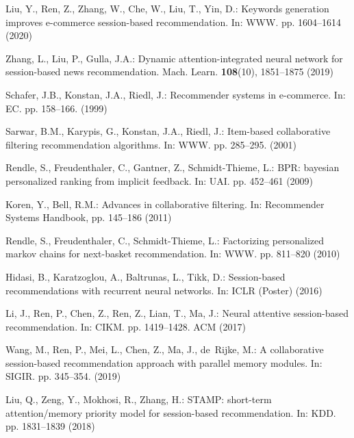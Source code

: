 \documentclass[runningheads]{llncs}
\begin{document}
\begin{thebibliography}{8}


Liu, Y., Ren, Z., Zhang, W., Che, W., Liu, T., Yin, D.: Keywords generation
improves e-commerce session-based recommendation. In: {WWW}. pp. 1604--1614  (2020)

Zhang, L., Liu, P., Gulla, J.A.: Dynamic attention-integrated neural network
for session-based news recommendation. Mach. Learn.  \textbf{108}(10),
1851--1875 (2019)

Schafer, J.B., Konstan, J.A., Riedl, J.: Recommender systems in e-commerce. In: {EC}. pp. 158--166.   (1999)

Sarwar, B.M., Karypis, G., Konstan, J.A., Riedl, J.: Item-based collaborative
filtering recommendation algorithms. In: {WWW}. pp. 285--295.   (2001)

Rendle, S., Freudenthaler, C., Gantner, Z., Schmidt{-}Thieme, L.: {BPR:}
bayesian personalized ranking from implicit feedback. In: {UAI}. pp. 452--461
(2009)

Koren, Y., Bell, R.M.: Advances in collaborative filtering. In: Recommender
Systems Handbook, pp. 145--186 (2011)


Rendle, S., Freudenthaler, C., Schmidt{-}Thieme, L.: Factorizing personalized
markov chains for next-basket recommendation. In: {WWW}. pp. 811--820 (2010)


Hidasi, B., Karatzoglou, A., Baltrunas, L., Tikk, D.: Session-based
recommendations with recurrent neural networks. In: {ICLR} (Poster) (2016)

Li, J., Ren, P., Chen, Z., Ren, Z., Lian, T., Ma, J.: Neural attentive
session-based recommendation. In: {CIKM}. pp. 1419--1428. {ACM} (2017)        
      
Wang, M., Ren, P., Mei, L., Chen, Z., Ma, J., de~Rijke, M.: A collaborative
session-based recommendation approach with parallel memory modules. In:
{SIGIR}. pp. 345--354.   (2019)

Liu, Q., Zeng, Y., Mokhosi, R., Zhang, H.: {STAMP:} short-term attention/memory
priority model for session-based recommendation. In: {KDD}. pp. 1831--1839
(2018)
  

\end{thebibliography}
\end{document}
